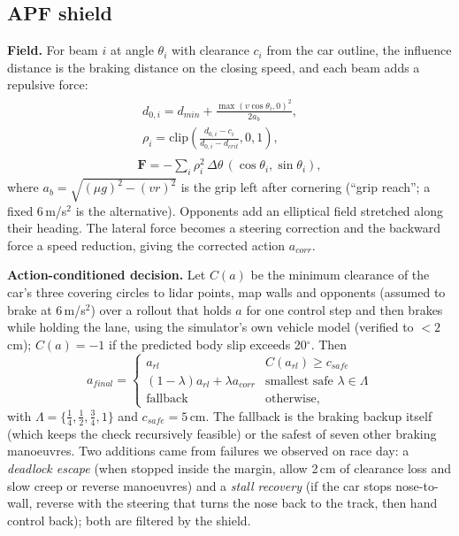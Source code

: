 \documentclass[conference]{IEEEtran}
\begin{document}
\subsection{APF shield}
\textbf{Field.} For beam $i$ at angle $\theta_i$ with clearance $c_i$ from the car outline, the influence distance
is the braking distance on the closing speed, and each beam adds a repulsive force:
\begin{gather}
\begin{gathered}
d_{0,i} = d_{min} + \frac{\max(v\cos\theta_i, 0)^2}{2 a_b},\\
\rho_i = \mathrm{clip}\!\left(\frac{d_{0,i} - c_i}{d_{0,i} - d_{crit}}, 0, 1\right),
\end{gathered}\\
\mathbf{F} = -\textstyle\sum_i \rho_i^2\, \Delta\theta \,(\cos\theta_i, \sin\theta_i),
\end{gather}
where $a_b = \sqrt{(\mu g)^2 - (v r)^2}$ is the grip left after cornering (``grip reach''; a fixed 6\,m/s$^2$
is the alternative). Opponents add an elliptical field stretched along their heading. The lateral force becomes a
steering correction and the backward force a speed reduction, giving the corrected action $a_{corr}$.

\textbf{Action-conditioned decision.} Let $C(a)$ be the minimum clearance of the car's three covering circles to
lidar points, map walls and opponents (assumed to brake at 6\,m/s$^2$) over a rollout that holds $a$ for one
control step and then brakes while holding the lane, using the simulator's own vehicle model (verified to
$<2$\,cm); $C(a) = -1$ if the predicted body slip exceeds 20$^\circ$. Then
\begin{equation}
a_{final} =
\begin{cases}
a_{rl} & C(a_{rl}) \ge c_{safe}\\
(1-\lambda) a_{rl} + \lambda a_{corr} & \text{smallest safe } \lambda \in \Lambda\\
\text{fallback} & \text{otherwise,}
\end{cases}
\end{equation}
with $\Lambda = \{\tfrac14,\tfrac12,\tfrac34,1\}$ and $c_{safe} = 5$\,cm. The fallback is the braking backup itself (which keeps the check recursively feasible)
or the safest of seven other braking manoeuvres. Two additions came from failures we observed on race day:
a \emph{deadlock escape} (when stopped inside the margin, allow 2\,cm of clearance loss and slow creep or reverse
manoeuvres) and a \emph{stall recovery} (if the car stops nose-to-wall, reverse with the steering that turns the
nose back to the track, then hand control back); both are filtered by the shield.
\end{document}
